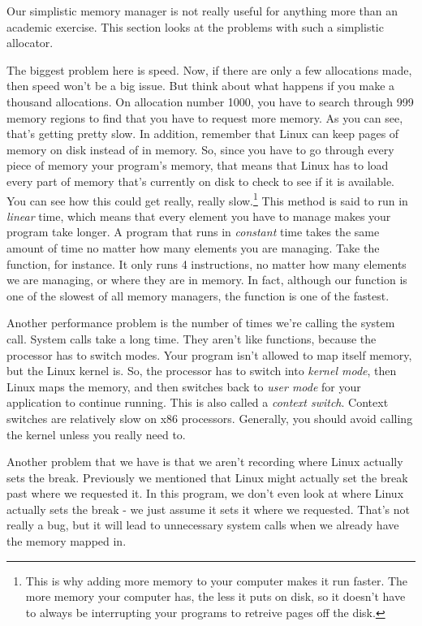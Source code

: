 Our simplistic memory manager is not really useful for anything more than an academic exercise.
This section looks at the problems with such a simplistic allocator.

The biggest problem here is speed.  Now, if there are only a few allocations made,
then speed won't be a big issue.  But think about what happens if you make a thousand
allocations.  On allocation number 1000, you have to search through 999 memory regions
to find that you have to request more memory.  As you can see, that's getting pretty
slow.  In addition, remember that Linux can keep pages of memory on disk instead of in
memory.  So, since you have to go through every piece of memory your program's memory, that means that Linux
has to load every part of memory that's currently on disk to check to see if it is available.  
You can see how this could get really, really slow.\footnote{This is why adding more
memory to your computer makes it run faster.  The more memory your computer has, the
less it puts on disk, so it doesn't have to always be interrupting your programs to
retreive pages off the disk.}  This method is said to run in 
\emph{linear} time, which means that every element you have to
manage makes your program take longer.   A program that runs in \emph{constant}
time takes the same amount of time no matter how many elements you are managing.
Take the  function, for instance.  It only runs 4 instructions,
no matter how many elements we are managing, or where they are in memory.  In fact, although
our  function is one of the slowest of all memory managers,
the  function is one of the fastest.  

Another performance problem is the number of times we're calling the 
system call.
System calls take a long time.  They aren't like functions, because the processor has
to switch modes.  Your program isn't allowed to map itself memory, but the Linux kernel is.  
So, the processor has to switch into \emph{kernel mode}, then Linux maps the
memory, and then switches back to \emph{user mode} for your application to continue running.  
This is also called
a \emph{context switch}.  
Context switches are relatively slow on x86 processors.
Generally, you should avoid calling the kernel unless you really need to.  

Another problem that we have is that we aren't recording where Linux actually sets the break.  
Previously we mentioned that Linux might actually set the break past where we requested
it.  In this program, we don't even look at where Linux actually sets the break - we just
assume it sets it where we requested.  That's not really a bug, but it will lead to 
unnecessary  system calls when we already have the memory mapped in.

